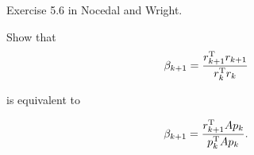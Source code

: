 \begin{problem}
  Exercise 5.6 in Nocedal and Wright.

  Show that
  \[ \beta_{k+1} = \frac{r_{k+1}^{\textnormal{T}} r_{k+1}}{r_{k}^{\textnormal{T}} r_{k}} \]

  is equivalent to

  \[ \beta_{k+1} = \frac{r_{k+1}^{\textnormal{T}} Ap_{k}}{p_{k}^{\textnormal{T}} Ap_{k}} \text{.}\]
\end{problem}

